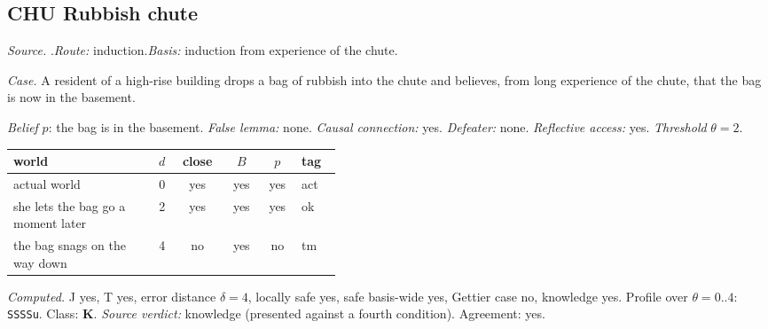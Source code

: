 \subsection*{CHU \enspace Rubbish chute}
\noindent\textit{Source.} \citet{Sosa1999}.\quad \textit{Route:} induction.\quad \textit{Basis:} induction from experience of the chute.\par
\noindent\textit{Case.} A resident of a high-rise building drops a bag of rubbish into the chute and believes, from long experience of the chute, that the bag is now in the basement.\par
\noindent\textit{Belief} $p$: the bag is in the basement.
 \textit{False lemma:} none. \textit{Causal connection:} yes. \textit{Defeater:} none. \textit{Reflective access:} yes. \textit{Threshold} $\theta = 2$.\par
\begin{center}\begin{tabular}{@{}p{0.43\linewidth}rcccl@{}}
world & $d$ & close & $B$ & $p$ & tag \\ \midrule
actual world & 0 & yes & yes & yes & act \\
she lets the bag go a moment later & 2 & yes & yes & yes & ok \\
the bag snags on the way down & 4 & no & yes & no & tm \\
\end{tabular}\end{center}
\noindent\textit{Computed.} J yes, T yes, error distance $\delta = 4$, locally safe yes, safe basis-wide yes, Gettier case no, knowledge yes. Profile over $\theta = 0..4$: \texttt{SSSSu}. Class: \textbf{K}.
 \textit{Source verdict:} knowledge (presented against a fourth condition). Agreement: yes.
\par\medskip
{}
